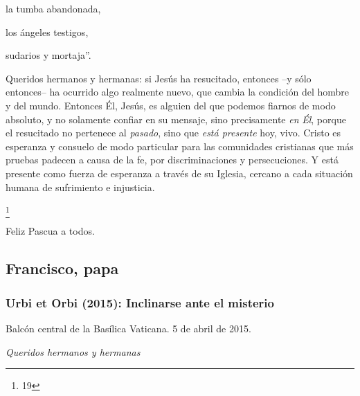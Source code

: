			\begin{bodyprose}la tumba abandonada, \end{bodyprose}
			
			\begin{bodyprose}los ángeles testigos, \end{bodyprose}
			
			\begin{bodyprose}sudarios y mortaja”. \end{bodyprose}
			
			\begin{body}Queridos hermanos y hermanas: si Jesús ha resucitado, entonces –y sólo entonces– ha ocurrido algo realmente nuevo, que cambia la condición del hombre y del mundo. Entonces Él, Jesús, es alguien del que podemos fiarnos de modo absoluto, y no solamente confiar en su mensaje, sino precisamente \textit{en} \textit{Él}, porque el resucitado no pertenece al \textit{pasado}, sino que \textit{está presente }hoy, vivo. Cristo es esperanza y consuelo de modo particular para las comunidades cristianas que más pruebas padecen a causa de la fe, por discriminaciones y persecuciones. Y está presente como fuerza de esperanza a través de su Iglesia, cercano a cada situación humana de sufrimiento e injusticia. \end{body}
			
			\begin{body}[...]\footnote{19}\end{body}
			
			\begin{body}Feliz Pascua a todos. \end{body}
			
			\subsection{Francisco, papa}
			
			\subsubsection{Urbi et Orbi (2015): Inclinarse ante el misterio}
			
			\begin{referencia}Balcón central de la Basílica Vaticana. 5 de abril de 2015.\end{referencia}
			
			\begin{body}\textit{Queridos hermanos y hermanas}\end{body}
			
